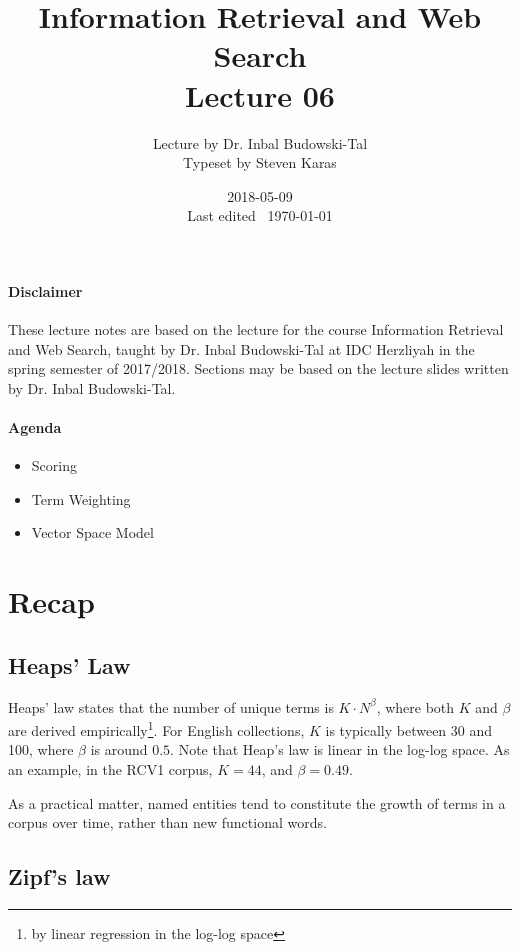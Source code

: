 \documentclass{idc_msc}
\title{Information Retrieval and Web Search\\\large Lecture 06}
\date{2018-05-09 \\ Last edited \currenttime\ \today}
\author{Lecture by Dr. Inbal Budowski-Tal\\Typeset by Steven Karas}
\begin{document}
\maketitle

\paragraph{Disclaimer}

These lecture notes are based on the lecture for the course Information Retrieval and Web Search, taught by Dr. Inbal Budowski-Tal at IDC Herzliyah in the spring semester of 2017/2018.
Sections may be based on the lecture slides written by Dr. Inbal Budowski-Tal.

\paragraph{Agenda}

\begin{itemize}
  \item Scoring
  \item Term Weighting
  \item Vector Space Model
\end{itemize}

\nocite{manning2008introduction}

\section{Recap}

\subsection{Heaps' Law}

Heaps' law states that the number of unique terms is \(K \cdot N^\beta\), where both \(K\) and \(\beta\) are derived empirically\footnote{by linear regression in the log-log space}.
For English collections, \(K\) is typically between 30 and 100, where \(\beta\) is around \(0.5\).
Note that Heap's law is linear in the log-log space.
As an example, in the RCV1 corpus, \(K=44\), and \(\beta = 0.49\).

As a practical matter, named entities tend to constitute the growth of terms in a corpus over time, rather than new functional words.

\subsection{Zipf's law}
\end{document}

